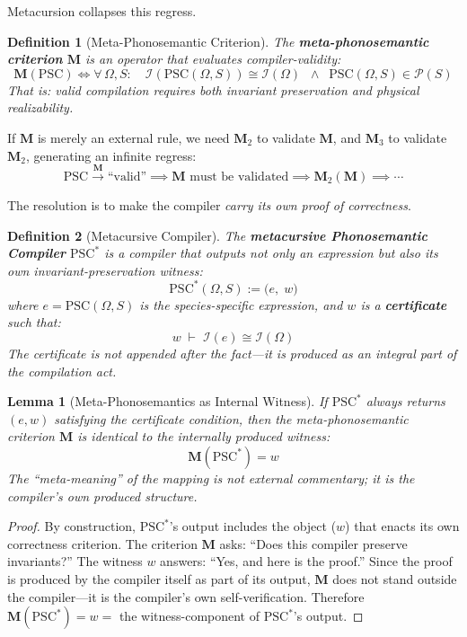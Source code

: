 \documentclass[12pt, letterpaper]{book}
\def\equiv{=}%
\newtheorem{lemma}[theorem]{Lemma}
\newtheorem{definition}{Definition}[chapter]
\begin{document}
Metacursion collapses this regress.

\begin{definition}[Meta-Phonosemantic Criterion]\label{def:meta-phon}
The \textbf{meta-phonosemantic criterion} $\mathbf{M}$ is an operator that evaluates compiler-validity:
\[
\mathbf{M}(\mathrm{PSC}) \iff \forall\, \Omega, S: \quad \mathcal{I}(\mathrm{PSC}(\Omega, S)) \cong \mathcal{I}(\Omega) \;\;\land\;\; \mathrm{PSC}(\Omega, S) \in \mathcal{P}(S)
\]
That is: valid compilation requires both invariant preservation and physical realizability.
\end{definition}

If $\mathbf{M}$ is merely an external rule, we need $\mathbf{M}_2$ to validate $\mathbf{M}$, and $\mathbf{M}_3$ to validate $\mathbf{M}_2$, generating an infinite regress:
\[
\mathrm{PSC} \xrightarrow{\mathbf{M}} \text{``valid''} \implies \mathbf{M} \text{ must be validated} \implies \mathbf{M}_2(\mathbf{M}) \implies \cdots
\]

The resolution is to make the compiler \textit{carry its own proof of correctness}.

\begin{definition}[Metacursive Compiler]\label{def:psc-star}
The \textbf{metacursive Phonosemantic Compiler} $\mathrm{PSC}^*$ is a compiler that outputs not only an expression but also its own invariant-preservation witness:
\[
\mathrm{PSC}^*(\Omega, S) := \big(e,\; w\big)
\]
where $e = \mathrm{PSC}(\Omega, S)$ is the species-specific expression, and $w$ is a \textbf{certificate} such that:
\[
w \;\vdash\; \mathcal{I}(e) \cong \mathcal{I}(\Omega)
\]
The certificate is not appended after the fact---it is produced as an integral part of the compilation act.
\end{definition}

\begin{lemma}[Meta-Phonosemantics as Internal Witness]\label{lem:witness}
If $\mathrm{PSC}^*$ always returns $(e, w)$ satisfying the certificate condition, then the meta-phonosemantic criterion $\mathbf{M}$ is identical to the internally produced witness:
\[
\mathbf{M}(\mathrm{PSC}^*) \equiv w
\]
The ``meta-meaning'' of the mapping is not external commentary; it is the compiler's own produced structure.
\end{lemma}

\begin{proof}
By construction, $\mathrm{PSC}^*$'s output includes the object ($w$) that enacts its own correctness criterion. The criterion $\mathbf{M}$ asks: ``Does this compiler preserve invariants?'' The witness $w$ answers: ``Yes, and here is the proof.'' Since the proof is produced by the compiler itself as part of its output, $\mathbf{M}$ does not stand outside the compiler---it is the compiler's own self-verification. Therefore $\mathbf{M}(\mathrm{PSC}^*) \equiv w \equiv$ the witness-component of $\mathrm{PSC}^*$'s output.
\end{proof}
\end{document}
